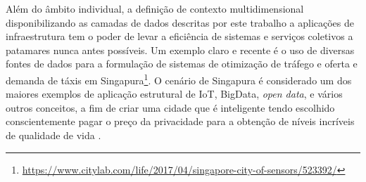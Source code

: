 Além do âmbito individual, a definição de contexto multidimensional disponibilizando as camadas de dados descritas por este trabalho a aplicações de infraestrutura tem o poder de levar a eficiência de sistemas e serviços coletivos a patamares nunca antes possíveis. Um exemplo claro e recente é o uso de diversas fontes de dados para a formulação de sistemas de otimização de tráfego e oferta e demanda de táxis em Singapura\footnote{\url{https://www.citylab.com/life/2017/04/singapore-city-of-sensors/523392/}}. O cenário de Singapura é considerado um dos maiores exemplos de aplicação estrutural de IoT, BigData, \textit{open data}, e vários outros conceitos, a fim de criar uma cidade que é inteligente tendo escolhido conscientemente pagar o preço da privacidade para a obtenção de níveis incríveis de qualidade de vida \cite{keon2016international}.